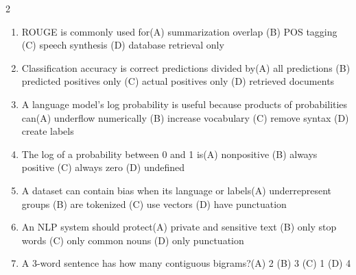 \documentclass[a4paper]{article}
\begin{document}
\begin{multicols*}{2}
\begin{enumerate}[resume]
\item ROUGE is commonly used for\newline\hspace*{0.6em}(A) summarization overlap \quad (B) POS tagging \newline\hspace*{0.6em}(C) speech synthesis \quad (D) database retrieval only
\item Classification accuracy is correct predictions divided by\newline\hspace*{0.6em}(A) all predictions \quad (B) predicted positives only \newline\hspace*{0.6em}(C) actual positives only \quad (D) retrieved documents
\item A language model's log probability is useful because products of probabilities can\newline\hspace*{0.6em}(A) underflow numerically \quad (B) increase vocabulary \newline\hspace*{0.6em}(C) remove syntax \quad (D) create labels
\item The log of a probability between 0 and 1 is\newline\hspace*{0.6em}(A) nonpositive \quad (B) always positive \newline\hspace*{0.6em}(C) always zero \quad (D) undefined
\item A dataset can contain bias when its language or labels\newline\hspace*{0.6em}(A) underrepresent groups \quad (B) are tokenized \newline\hspace*{0.6em}(C) use vectors \quad (D) have punctuation
\item An NLP system should protect\newline\hspace*{0.6em}(A) private and sensitive text \quad (B) only stop words \newline\hspace*{0.6em}(C) only common nouns \quad (D) only punctuation
\item A 3-word sentence has how many contiguous bigrams?\newline\hspace*{0.6em}(A) 2 \quad (B) 3 \newline\hspace*{0.6em}(C) 1 \quad (D) 4

\end{enumerate}
\end{multicols*}
\end{document}
